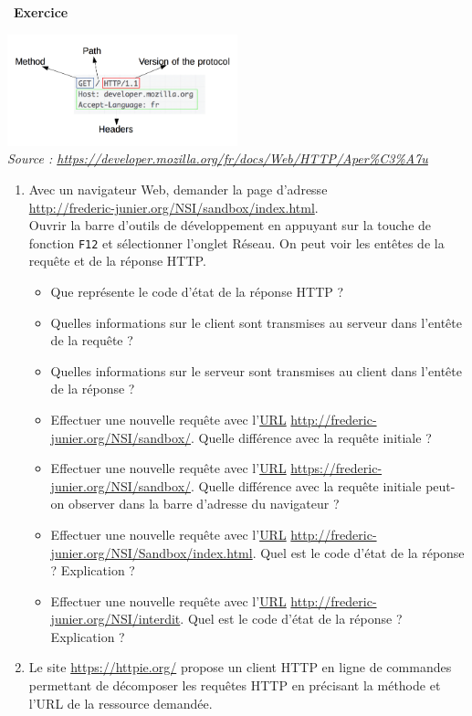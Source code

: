 \documentclass[
  11pt,
]{article}
\newcommand{\passthrough}[1]{#1}
\providecommand{\tightlist}{%
  \setlength{\itemsep}{0pt}\setlength{\parskip}{0pt}}
\newcounter{exo}
\newenvironment{exercice}[1]
{\par \medskip   \addtocounter{exo}{1} \noindent  
\begin{bclogo}[arrondi =0.1,   noborder = true, logo=\bccrayon, marge=4]{~\textbf{Exercice} \textbf{\theexo} {\itshape #1} }  \par}
{
\end{bclogo}
 \par \bigskip }
\newcounter{prop}
\newcounter{def}
\begin{document}
\begin{exercice}{}

\includegraphics[width=0.5\textwidth,height=\textheight]{images/HTTP_Request.png}\\
\emph{Source :
\url{https://developer.mozilla.org/fr/docs/Web/HTTP/Aper\%C3\%A7u}}

\begin{enumerate}
\def\labelenumi{\arabic{enumi}.}
\item
  Avec un navigateur Web, demander la page d'adresse\\
  \url{http://frederic-junier.org/NSI/sandbox/index.html}.\\
  Ouvrir la barre d'outils de développement en appuyant sur la touche de
  fonction \passthrough{\lstinline!F12!} et sélectionner l'onglet
  Réseau. On peut voir les entêtes de la requête et de la réponse HTTP.

  \begin{itemize}
  \tightlist
  \item
    Que représente le code d'état de la réponse HTTP ?
  \item
    Quelles informations sur le client sont transmises au serveur dans
    l'entête de la requête ?
  \item
    Quelles informations sur le serveur sont transmises au client dans
    l'entête de la réponse ?
  \item
    Effectuer une nouvelle requête avec
    l'\href{https://developer.mozilla.org/fr/docs/Glossaire/URL}{URL}
    \url{http://frederic-junier.org/NSI/sandbox/}. Quelle différence
    avec la requête initiale ?
  \item
    Effectuer une nouvelle requête avec
    l'\href{https://developer.mozilla.org/fr/docs/Glossaire/URL}{URL}
    \url{https://frederic-junier.org/NSI/sandbox/}. Quelle différence
    avec la requête initiale peut-on observer dans la barre d'adresse du
    navigateur ?
  \item
    Effectuer une nouvelle requête avec
    l'\href{https://developer.mozilla.org/fr/docs/Glossaire/URL}{URL}
    \url{http://frederic-junier.org/NSI/Sandbox/index.html}. Quel est le
    code d'état de la réponse ? Explication ?
  \item
    Effectuer une nouvelle requête avec
    l'\href{https://developer.mozilla.org/fr/docs/Glossaire/URL}{URL}
    \url{http://frederic-junier.org/NSI/interdit}. Quel est le code
    d'état de la réponse ? Explication ?
  \end{itemize}
\item
  Le site \url{https://httpie.org/} propose un client HTTP en ligne de
  commandes permettant de décomposer les requêtes HTTP en précisant la
  méthode et l'URL de la ressource demandée.


\end{enumerate}
\end{exercice}
\end{document}
